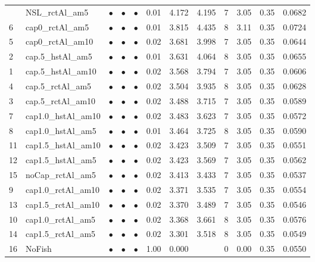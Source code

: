 \documentclass[11pt]{book}
\begin{document}
\begin{landscape}
\begin{longtable}[t]{llcccccccccc}
\midrule
\endhead
\
\endfoot
\bottomrule
\endlastfoot
17 & NSL\_rctAl\_am5 & $\bullet$ & $\bullet$ & $\bullet$ & 0.01 & 4.172 & 4.195 & 7 & 3.05 & 0.35 & 0.0682\\
6 & cap0\_rctAl\_am5 & $\bullet$ & $\bullet$ & $\bullet$ & 0.01 & 3.815 & 4.435 & 8 & 3.11 & 0.35 & 0.0724\\
5 & cap0\_rctAl\_am10 & $\bullet$ & $\bullet$ & $\bullet$ & 0.02 & 3.681 & 3.998 & 7 & 3.05 & 0.35 & 0.0644\\
2 & cap.5\_hstAl\_am5 & $\bullet$ & $\bullet$ & $\bullet$ & 0.01 & 3.631 & 4.064 & 8 & 3.05 & 0.35 & 0.0655\\
1 & cap.5\_hstAl\_am10 & $\bullet$ & $\bullet$ & $\bullet$ & 0.02 & 3.568 & 3.794 & 7 & 3.05 & 0.35 & 0.0606\\
4 & cap.5\_rctAl\_am5 & $\bullet$ & $\bullet$ & $\bullet$ & 0.02 & 3.504 & 3.935 & 8 & 3.05 & 0.35 & 0.0628\\
3 & cap.5\_rctAl\_am10 & $\bullet$ & $\bullet$ & $\bullet$ & 0.02 & 3.488 & 3.715 & 7 & 3.05 & 0.35 & 0.0589\\
7 & cap1.0\_hstAl\_am10 & $\bullet$ & $\bullet$ & $\bullet$ & 0.02 & 3.483 & 3.623 & 7 & 3.05 & 0.35 & 0.0572\\
8 & cap1.0\_hstAl\_am5 & $\bullet$ & $\bullet$ & $\bullet$ & 0.01 & 3.464 & 3.725 & 8 & 3.05 & 0.35 & 0.0590\\
11 & cap1.5\_hstAl\_am10 & $\bullet$ & $\bullet$ & $\bullet$ & 0.02 & 3.423 & 3.509 & 7 & 3.05 & 0.35 & 0.0551\\
12 & cap1.5\_hstAl\_am5 & $\bullet$ & $\bullet$ & $\bullet$ & 0.02 & 3.423 & 3.569 & 7 & 3.05 & 0.35 & 0.0562\\
15 & noCap\_rctAl\_am5 & $\bullet$ & $\bullet$ & $\bullet$ & 0.02 & 3.413 & 3.433 & 7 & 3.05 & 0.35 & 0.0537\\
9 & cap1.0\_rctAl\_am10 & $\bullet$ & $\bullet$ & $\bullet$ & 0.02 & 3.371 & 3.535 & 7 & 3.05 & 0.35 & 0.0554\\
13 & cap1.5\_rctAl\_am10 & $\bullet$ & $\bullet$ & $\bullet$ & 0.02 & 3.370 & 3.489 & 7 & 3.05 & 0.35 & 0.0546\\
10 & cap1.0\_rctAl\_am5 & $\bullet$ & $\bullet$ & $\bullet$ & 0.02 & 3.368 & 3.661 & 8 & 3.05 & 0.35 & 0.0576\\
14 & cap1.5\_rctAl\_am5 & $\bullet$ & $\bullet$ & $\bullet$ & 0.02 & 3.301 & 3.518 & 8 & 3.05 & 0.35 & 0.0549\\
16 & NoFish & $\bullet$ & $\bullet$ & $\bullet$ & 1.00 & 0.000 &  & 0 & 0.00 & 0.35 & 0.0550\\*
\end{longtable}
\end{landscape}
\endgroup{}
\end{document}
